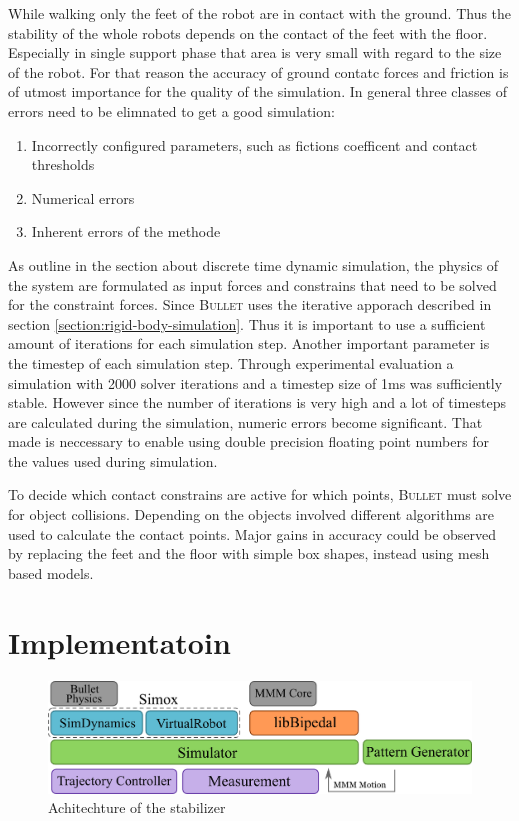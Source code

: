 \documentclass[english,ngerman]{KITreprt}
\newcommand{\name}[1]{\textsc{#1}}
\begin{document}
While walking only the feet of the robot are in contact with the ground.
Thus the stability of the whole robots depends on the contact of the
feet with the floor. Especially in single support phase that area is
very small with regard to the size of the robot. For that reason the
accuracy of ground contatc forces and friction is of utmost importance
for the quality of the simulation. In general three classes of errors
need to be elimnated to get a good simulation:

\begin{enumerate}
\def\labelenumi{\arabic{enumi}.}
\item
  Incorrectly configured parameters, such as fictions coefficent and
  contact thresholds
\item
  Numerical errors
\item
  Inherent errors of the methode
\end{enumerate}

As outline in the section about discrete time dynamic simulation, the
physics of the system are formulated as input forces and constrains that
need to be solved for the constraint forces. Since \name{Bullet} uses
the iterative apporach described in section
\ref{section:rigid-body-simulation}. Thus it is important to use a
sufficient amount of iterations for each simulation step. Another
important parameter is the timestep of each simulation step. Through
experimental evaluation a simulation with 2000 solver iterations and a
timestep size of 1ms was sufficiently stable. However since the number
of iterations is very high and a lot of timesteps are calculated during
the simulation, numeric errors become significant. That made is
neccessary to enable using double precision floating point numbers for
the values used during simulation.

To decide which contact constrains are active for which points,
\name{Bullet} must solve for object collisions. Depending on the objects
involved different algorithms are used to calculate the contact points.
Major gains in accuracy could be observed by replacing the feet and the
floor with simple box shapes, instead using mesh based models.

\section{Implementatoin}\label{implementatoin}

\begin{figure}[htb]
\vspace*{-1em}
\includegraphics[width=\textwidth]{images/architechture.png}
\caption{Achitechture of the stabilizer}
\label{img:stabilitzer-achitechture}
\end{figure}
\end{document}
